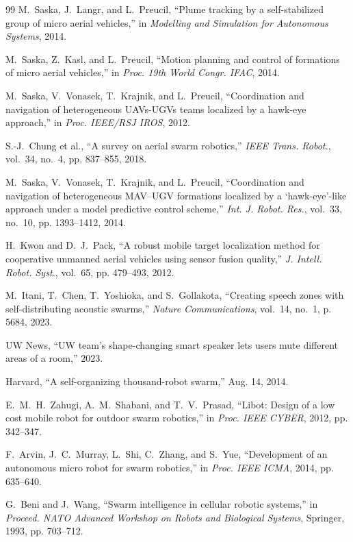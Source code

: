 \documentclass[letterpaper, 10pt, conference]{IEEEtran}
\begin{document}
\begin{thebibliography}{99}
M.~Saska, J.~Langr, and L.~Preucil, ``Plume tracking by a self-stabilized group of micro aerial vehicles,'' in \emph{Modelling and Simulation for Autonomous Systems}, 2014.

M.~Saska, Z.~Kasl, and L.~Preucil, ``Motion planning and control of formations of micro aerial vehicles,'' in \emph{Proc. 19th World Congr. IFAC}, 2014.

M.~Saska, V.~Vonasek, T.~Krajnik, and L.~Preucil, ``Coordination and navigation of heterogeneous {UAV}s-{UGV}s teams localized by a hawk-eye approach,'' in \emph{Proc. IEEE/RSJ IROS}, 2012.

S.-J.~Chung et al., ``A survey on aerial swarm robotics,'' \emph{IEEE Trans. Robot.}, vol.~34, no.~4, pp. 837--855, 2018.

M.~Saska, V.~Vonasek, T.~Krajnik, and L.~Preucil, ``Coordination and navigation of heterogeneous {MAV}–{UGV} formations localized by a ‘hawk-eye’-like approach under a model predictive control scheme,'' \emph{Int. J. Robot. Res.}, vol.~33, no.~10, pp. 1393--1412, 2014.

H.~Kwon and D.~J.~Pack, ``A robust mobile target localization method for cooperative unmanned aerial vehicles using sensor fusion quality,'' \emph{J. Intell. Robot. Syst.}, vol.~65, pp. 479--493, 2012.

M.~Itani, T.~Chen, T.~Yoshioka, and S.~Gollakota, ``Creating speech zones with self-distributing acoustic swarms,'' \emph{Nature Communications}, vol.~14, no.~1, p. 5684, 2023.

UW News, ``{UW} team's shape-changing smart speaker lets users mute different areas of a room,'' 2023.

Harvard, ``A self-organizing thousand-robot swarm,'' Aug. 14, 2014.

E.~M.~H.~Zahugi, A.~M.~Shabani, and T.~V.~Prasad, ``Libot: Design of a low cost mobile robot for outdoor swarm robotics,'' in \emph{Proc. IEEE CYBER}, 2012, pp. 342--347.

F.~Arvin, J.~C.~Murray, L.~Shi, C.~Zhang, and S.~Yue, ``Development of an autonomous micro robot for swarm robotics,'' in \emph{Proc. IEEE ICMA}, 2014, pp. 635--640.

G.~Beni and J.~Wang, ``Swarm intelligence in cellular robotic systems,'' in \emph{Proceed. NATO Advanced Workshop on Robots and Biological Systems}, Springer, 1993, pp. 703--712.


\end{thebibliography}
\end{document}
